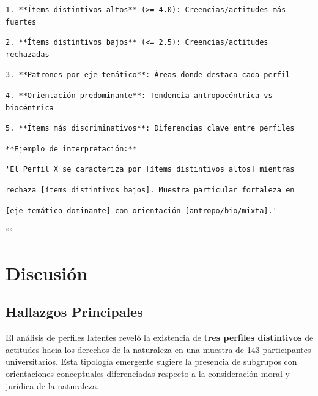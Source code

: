\documentclass[
  11pt,
  letterpaper,
  DIV=11,
  numbers=noendperiod]{scrartcl}
\begin{document}
\begin{verbatim}
1. **Ítems distintivos altos** (>= 4.0): Creencias/actitudes más fuertes
\end{verbatim}

\begin{verbatim}
2. **Ítems distintivos bajos** (<= 2.5): Creencias/actitudes rechazadas
\end{verbatim}

\begin{verbatim}
3. **Patrones por eje temático**: Áreas donde destaca cada perfil
\end{verbatim}

\begin{verbatim}
4. **Orientación predominante**: Tendencia antropocéntrica vs biocéntrica
\end{verbatim}

\begin{verbatim}
5. **Ítems más discriminativos**: Diferencias clave entre perfiles
\end{verbatim}

\begin{verbatim}
**Ejemplo de interpretación:**
\end{verbatim}

\begin{verbatim}
'El Perfil X se caracteriza por [ítems distintivos altos] mientras
\end{verbatim}

\begin{verbatim}
rechaza [ítems distintivos bajos]. Muestra particular fortaleza en
\end{verbatim}

\begin{verbatim}
[eje temático dominante] con orientación [antropo/bio/mixta].'
\end{verbatim}

```

\newpage

\section{Discusión}\label{discusiuxf3n}

\subsection{Hallazgos Principales}\label{hallazgos-principales}

El análisis de perfiles latentes reveló la existencia de \textbf{tres
perfiles distintivos} de actitudes hacia los derechos de la naturaleza
en una muestra de 143 participantes universitarios. Esta tipología
emergente sugiere la presencia de subgrupos con orientaciones
conceptuales diferenciadas respecto a la consideración moral y jurídica
de la naturaleza.
\end{document}
